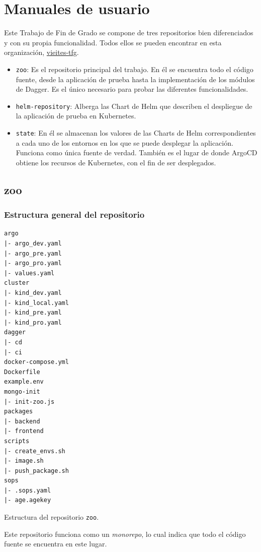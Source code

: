\chapter{Manuales de usuario}
\label{chap:usuario}
%
Este Trabajo de Fin de Grado se compone de tres repositorios bien diferenciados y con su propia funcionalidad. Todos ellos se pueden encontrar en esta organización, \href{https://github.com/vieites-tfg}{vieites-tfg}.

\begin{itemize}
  \item \texttt{zoo}: Es el repositorio principal del trabajo. En él se encuentra todo el código fuente, desde la aplicación de prueba hasta la implementación de los módulos de Dagger. Es el único necesario para probar las diferentes funcionalidades.
  \item \texttt{helm-repository}: Alberga las Chart de Helm que describen el despliegue de la aplicación de prueba en Kubernetes.
  \item \texttt{state}: En él se almacenan los valores de las Charts de Helm correspondientes a cada uno de los entornos en los que se puede desplegar la aplicación. Funciona como única fuente de verdad. También es el lugar de donde ArgoCD obtiene los recursos de Kubernetes, con el fin de ser desplegados.
\end{itemize}

\section{zoo}

\subsection*{Estructura general del repositorio}

\begin{longlisting}
  \begin{verbatim}
argo
|- argo_dev.yaml
|- argo_pre.yaml
|- argo_pro.yaml
|- values.yaml
cluster
|- kind_dev.yaml
|- kind_local.yaml
|- kind_pre.yaml
|- kind_pro.yaml
dagger
|- cd
|- ci
docker-compose.yml
Dockerfile
example.env
mongo-init
|- init-zoo.js
packages
|- backend
|- frontend
scripts
|- create_envs.sh
|- image.sh
|- push_package.sh
sops
|- .sops.yaml
|- age.agekey
\end{verbatim}
\caption{Estructura del repositorio \texttt{zoo}.}
\end{longlisting}

Este repositorio funciona como un \textit{monorepo}, lo cual indica que todo el código fuente se encuentra en este lugar.


